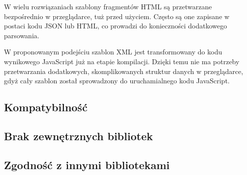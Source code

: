 W wielu rozwiązaniach szablony fragmentów HTML są przetwarzane bezpośrednio w przeglądarce,
tuż przed użyciem. Często są one zapisane w postaci kodu JSON lub HTML, co prowadzi
do konieczności dodatkowego parsowania.

W proponowanym podejściu szablon XML jest transformowany do kodu wynikowego JavaScript
już na etapie kompilacji. Dzięki temu nie ma potrzeby przetwarzania dodatkowych, skomplikowanych
struktur danych w przeglądarce, gdyż cały szablon został sprowadzony do uruchamialnego
kodu JavaScript.

\subsection{Kompatybilność}

\subsection{Brak zewnętrznych bibliotek}

\subsection{Zgodność z innymi bibliotekami}
